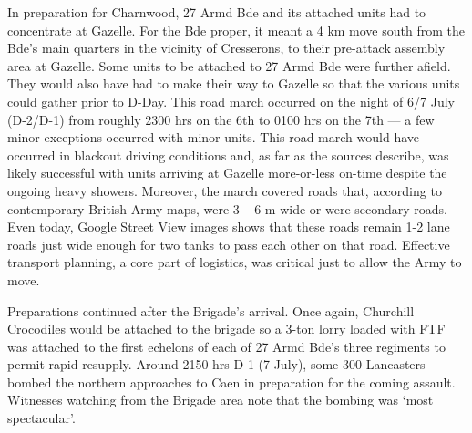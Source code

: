 \documentclass[noraggedright]{turabian-researchpaper}
\newcommand{\PlanningIntSum}{3 British Division Planning Intelligence Summary}
\begin{document}
In preparation for Charnwood, 27 Armd Bde and its attached units had to 
concentrate at Gazelle.  For the Bde proper, it meant a 4 km move south from 
the Bde's main quarters in the vicinity of Cresserons, to their pre-attack 
assembly area at Gazelle.  Some units to be attached to 27 Armd Bde were 
further afield. They would also have had to make their way to Gazelle so that 
the various units could gather prior to D-Day.  This road march occurred on 
the night of 6/7 July (D-2/D-1) from roughly 2300 hrs on the 6th to 0100 hrs 
on the 7th --- a few minor exceptions occurred with minor units.\autocite
[Appendix C, 27 Armd Bde Operation Order No 2, 6 July 1944]{27wd}  This road 
march would have occurred in blackout driving conditions and, as far as the 
sources describe, was likely successful with units arriving at Gazelle 
more-or-less on-time despite the ongoing heavy showers.\autocite[6 June 1944]
{1raf}
Moreover, the march covered roads that, according to contemporary British
Army maps, were 3 -- 6 m wide or were secondary roads.\autocites
[\PlanningIntSum][II-A-2 Page 2, Part III Appendix B note markings on ariel
photographs.]{3gwd}[See roads in Grid Reference (GR) 0080--0376, 0677--0776]
{7f}
Even today, Google Street View images shows that these roads remain 1-2 lane 
roads just wide enough for two tanks to pass each other on that road. %
Effective transport planning, a core part of logistics, was critical just
to allow the Army to move.

Preparations continued after the Brigade's arrival.  Once again, Churchill 
Crocodiles would be attached to the brigade so a 3-ton lorry loaded with FTF 
was attached to the first echelons of each of 27 Armd Bde's three regiments 
to permit rapid resupply.\autocite[7 July 1944]{90wd}  Around 2150 hrs D-1 (7 
July), some 300 Lancasters bombed the northern approaches to Caen in 
preparation for the coming assault. Witnesses watching from the Brigade area 
note that the bombing was `most spectacular'.\autocite[7 July 1944]{27wd} 






\end{document}

